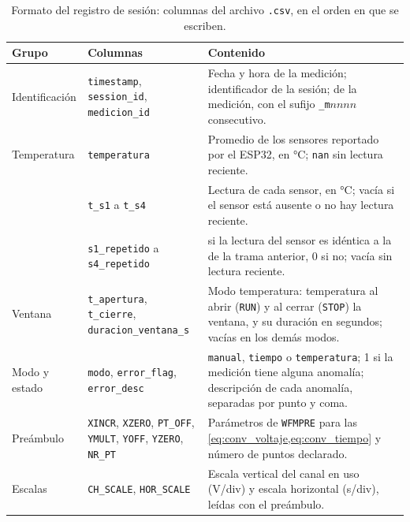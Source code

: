 \begin{table}[H]
  \centering
  \caption{Formato del registro de sesión: columnas del archivo
           \texttt{.csv}, en el orden en que se escriben.}
  \label{tab:formato_registro}
  \footnotesize
  \begin{tabularx}{\textwidth}{@{}>{\raggedright\arraybackslash}p{2.1cm}%
      >{\raggedright\arraybackslash}p{4.6cm}%
      >{\raggedright\arraybackslash}X@{}}
    \toprule
    \textbf{Grupo} & \textbf{Columnas} & \textbf{Contenido} \\
    \midrule
    Identificación &
      \texttt{timestamp}, \texttt{session\_id}, \texttt{medicion\_id} &
      Fecha y hora de la medición; identificador de la sesión; de la
      medición, con el sufijo \texttt{\_m}$nnnn$ consecutivo. \\
    \addlinespace
    Temperatura &
      \texttt{temperatura} &
      Promedio de los sensores reportado por el ESP32, en
      \si{\celsius}; \texttt{nan} sin lectura reciente. \\
    & \texttt{t\_s1} a \texttt{t\_s4} &
      Lectura de cada sensor, en \si{\celsius}; vacía si el sensor
      está ausente o no hay lectura reciente. \\
    & \texttt{s1\_repetido} a \texttt{s4\_repetido} &
      1 si la lectura del sensor es idéntica a la de la trama
      anterior, 0 si no; vacía sin lectura reciente. \\
    \addlinespace
    Ventana &
      \texttt{t\_apertura}, \texttt{t\_cierre},
      \texttt{duracion\_ventana\_s} &
      Modo temperatura: temperatura al abrir (\texttt{RUN}) y al cerrar
      (\texttt{STOP}) la ventana, y su duración en segundos; vacías en
      los demás modos. \\
    \addlinespace
    Modo y estado &
      \texttt{modo}, \texttt{error\_flag}, \texttt{error\_desc} &
      \texttt{manual}, \texttt{tiempo} o \texttt{temperatura}; 1 si la
      medición tiene alguna anomalía; descripción de cada anomalía,
      separadas por punto y coma. \\
    \addlinespace
    Preámbulo &
      \texttt{XINCR}, \texttt{XZERO}, \texttt{PT\_OFF}, \texttt{YMULT},
      \texttt{YOFF}, \texttt{YZERO}, \texttt{NR\_PT} &
      Parámetros de \texttt{WFMPRE} para las
      \cref{eq:conv_voltaje,eq:conv_tiempo} y número de puntos
      declarado. \\
    \addlinespace
    Escalas &
      \texttt{CH\_SCALE}, \texttt{HOR\_SCALE} &
      Escala vertical del canal en uso (\si{\volt}/div) y escala
      horizontal (\si{\second}/div), leídas con el preámbulo. \\

\end{tabularx}
\end{table}
